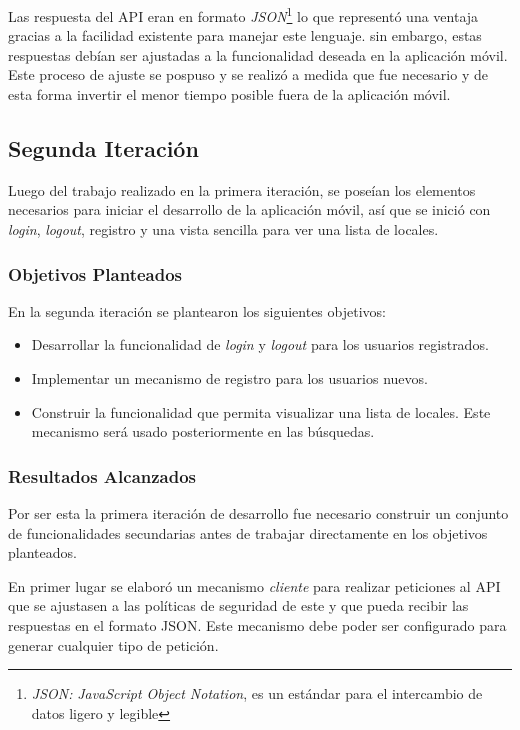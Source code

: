 Las respuesta del API eran en formato \textit{JSON}\footnote{\textit{JSON:} \textit{JavaScript Object Notation}, es un estándar para el intercambio de datos ligero y legible\cite{JSON}} lo que representó una ventaja gracias a la facilidad existente  para manejar este lenguaje. sin embargo, estas respuestas debían ser ajustadas a la funcionalidad deseada en la aplicación móvil. Este proceso de ajuste se pospuso y se realizó a medida que fue necesario y de esta forma invertir el menor tiempo posible fuera de la aplicación móvil.

\subsection{Segunda Iteración}

Luego del trabajo realizado en la primera iteración, se poseían los elementos necesarios para iniciar el desarrollo de la aplicación móvil, así que se inició con \textit{login}, \textit{logout}, registro y una vista sencilla para ver una lista de locales.

\subsubsection{Objetivos Planteados}
En la segunda iteración se plantearon los siguientes objetivos:
\begin{itemize}
\item Desarrollar la funcionalidad de \textit{login} y \textit{logout} para los usuarios registrados.
\item Implementar un mecanismo de registro para los usuarios nuevos.
\item Construir la funcionalidad que permita visualizar una lista de locales. Este mecanismo será usado posteriormente en las búsquedas. 
\end{itemize}


\subsubsection{Resultados Alcanzados}

Por ser esta la primera iteración de desarrollo fue necesario construir un conjunto de funcionalidades secundarias antes de trabajar directamente en los objetivos planteados.

En primer lugar se elaboró un mecanismo \textit{cliente} para realizar peticiones al API que se ajustasen a las políticas de seguridad de este y que pueda recibir las respuestas en el formato JSON. Este mecanismo debe poder ser configurado para generar cualquier tipo de petición.

